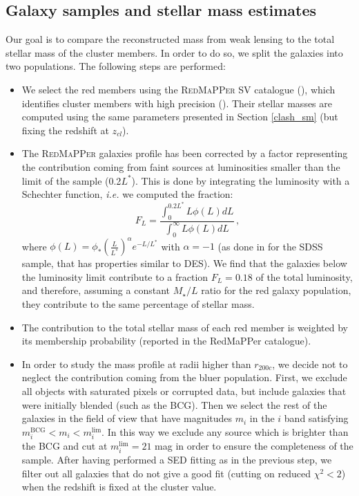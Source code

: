 {\subsection{Galaxy samples and stellar mass estimates}   
Our goal is to compare the reconstructed mass from weak lensing to the total stellar mass of the cluster members. In order to do so, we split the galaxies into two populations. The following steps are performed:
\begin{itemize}
\item We select the red members using the \textsc{RedMaPPer} SV catalogue (\citealt{rykoff}), which identifies cluster members with high precision (\citealt{rozo}). Their stellar masses are computed using the same parameters presented in Section \ref{clash_sm} (but fixing the redshift at $z_{cl}$). 
\item The \textsc{RedMaPPer} galaxies profile has been corrected by a factor representing the contribution coming from faint sources at luminosities smaller than the limit of the sample (0.2$L^*$). This is done by integrating the luminosity with a Schechter function, \emph{i.e.} we computed the fraction:
\begin{equation}
F_L=\frac{\int^{0.2L^*}_0 L \phi(L)d L }{\int_{0}^\infty L\phi(L)d L} \, ,
\end{equation}
where $\phi(L)=\phi_*(\frac{L}{L^*})^\alpha e^{-L/L^*}$ with $\alpha =-1$ (as done in \citealt{redpaper} for the SDSS sample, that has properties similar to DES). We find that the galaxies below the luminosity limit contribute to a fraction $F_L=0.18$ of the total luminosity, and therefore, assuming a constant $M_\star/L$ ratio for the red galaxy population, they contribute to the same percentage of stellar mass.
\item The contribution to the total stellar mass of each red member is weighted by its membership probability (reported in the RedMaPPer catalogue).
\item In order to study the mass profile at radii higher than $r_{200c}$, we decide not to neglect the contribution coming from the bluer population. First, we exclude all objects with saturated pixels or corrupted data, but include galaxies that were initially blended (such as the BCG). Then we select the rest of the galaxies in the field of view that have magnitudes $m_i$ in the $i$ band satisfying $m_i^\mathrm{BCG}<m_i<m_i^\mathrm{lim}$. In this way we exclude any source which is brighter than the BCG and cut at $m_i^\mathrm{lim}=21$ mag in order to ensure the completeness of the sample. After having performed a SED fitting as in the previous step, we filter out all galaxies that do not give a good fit (cutting on reduced $\chi^2<2$) when the redshift is fixed at the cluster value. 
\end{itemize}


}
